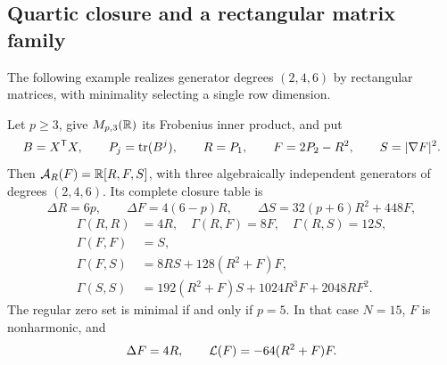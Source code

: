 \subsection{Quartic closure and a rectangular matrix family}
\label{sec:quartic-gradient-closure}

The following example realizes generator degrees $(2,4,6)$ by
rectangular matrices, with minimality selecting a single row dimension.

\begin{proposition}
\label{ex:rectangular-gradient-closure}
\label{prop:rectangular-minimal-selection}
Let \(p\ge3\), give \(M_{p,3}(\mathbb R)\) its Frobenius inner product,
and put
\begin{equation}\label{eq:rectangular-quartic-definition}
 B=X^{\mathsf T}X,\qquad P_j=\operatorname{tr}(B^j),\qquad
 R=P_1,\qquad F=2P_2-R^2,\qquad S=|\nabla F|^2.
\end{equation}
Then \(\mathcal A_R(F)=\mathbb R[R,F,S]\), with three algebraically independent
generators of degrees \((2,4,6)\). Its complete closure table is
\begin{equation}\label{eq:rectangular-quartic-laplacians}
 \Delta R=6p,\qquad \Delta F=4(6-p)R,\qquad
 \Delta S=32(p+6)R^2+448F,
\end{equation}
\begin{equation}\label{eq:rectangular-quartic-gamma}
 \begin{aligned}
 \Gamma(R,R)&=4R,\quad \Gamma(R,F)=8F,\quad \Gamma(R,S)=12S,\\
 \Gamma(F,F)&=S,\\
 \Gamma(F,S)&=8RS+128(R^2+F)F,\\
 \Gamma(S,S)&=192(R^2+F)S+1024R^3F+2048RF^2.
 \end{aligned}
\end{equation}
The regular zero set is minimal if and only if \(p=5\). In that
case \(N=15\), \(F\) is nonharmonic, and
\begin{equation}\label{eq:rectangular-quartic-minimality}
 \Delta F=4R,\qquad \mathcal L(F)=-64(R^2+F)F.
\end{equation}
\end{proposition}

